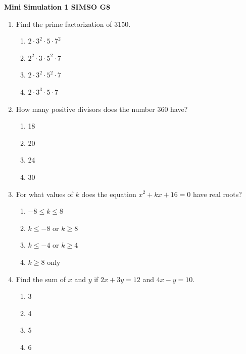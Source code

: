\documentclass[12pt]{article}
\begin{document}
\begin{center}
    \textbf{\Large Mini Simulation 1 SIMSO G8}
\end{center}

\vspace{0.5cm}

\begin{enumerate}

    \item Find the prime factorization of 3150.
    \begin{enumerate}
        \item $2 \cdot 3^2 \cdot 5 \cdot 7^2$
        \item $2^2 \cdot 3 \cdot 5^2 \cdot 7$
        \item $2 \cdot 3^2 \cdot 5^2 \cdot 7$
        \item $2 \cdot 3^3 \cdot 5 \cdot 7$
    \end{enumerate}

    \item How many positive divisors does the number 360 have?
    \begin{enumerate}
        \item 18
        \item 20
        \item 24
        \item 30
    \end{enumerate}

    \item For what values of $k$ does the equation $x^2 + kx + 16 = 0$ have real roots?
    \begin{enumerate}
        \item $-8 \le k \le 8$
        \item $k \le -8 \text{ or } k \ge 8$
        \item $k \le -4 \text{ or } k \ge 4$
        \item $k \ge 8 \text{ only}$
    \end{enumerate}

    \item Find the sum of $x$ and $y$ if $2x + 3y = 12$ and $4x - y = 10$.
    \begin{enumerate}
        \item 3
        \item 4
        \item 5
        \item 6
    \end{enumerate}


\end{enumerate}
\end{document}
